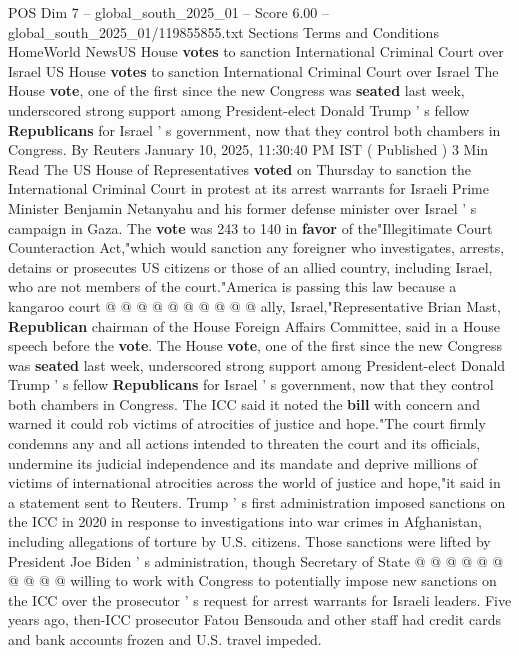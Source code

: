 \begin{textsample}{POS Dim 7 – global\_south\_2025\_01 – Score 6.00 – global\_south\_2025\_01/119855855.txt}  \label{ex:f7_pos_341}
Sections Terms and Conditions HomeWorld NewsUS House \textbf{votes} to sanction International Criminal Court over Israel US House \textbf{votes} to sanction International Criminal Court over Israel The House \textbf{vote}, one of the first since the new Congress was \textbf{seated} last week, underscored strong support among President-elect Donald Trump ' s fellow \textbf{Republicans} for Israel ' s government, now that they control both chambers in Congress.
By Reuters January 10, 2025, 11:30:40 PM IST ( Published ) 3 Min Read The US House of Representatives \textbf{voted} on Thursday to sanction the International Criminal Court in protest at its arrest warrants for Israeli Prime Minister Benjamin Netanyahu and his former defense minister over Israel ' s campaign in Gaza.
The \textbf{vote} was 243 to 140 in \textbf{favor} of the"Illegitimate Court Counteraction Act,"which would sanction any foreigner who investigates, arrests, detains or prosecutes US citizens or those of an allied country, including Israel, who are not members of the court."America is passing this law because a kangaroo court @ @ @ @ @ @ @ @ @ @ ally, Israel,"Representative Brian Mast, \textbf{Republican} chairman of the House Foreign Affairs Committee, said in a House speech before the \textbf{vote}.
The House \textbf{vote}, one of the first since the new Congress was \textbf{seated} last week, underscored strong support among President-elect Donald Trump ' s fellow \textbf{Republicans} for Israel ' s government, now that they control both chambers in Congress.
The ICC said it noted the \textbf{bill} with concern and warned it could rob victims of atrocities of justice and hope."The court firmly condemns any and all actions intended to threaten the court and its officials, undermine its judicial independence and its mandate and deprive millions of victims of international atrocities across the world of justice and hope,"it said in a statement sent to Reuters.
Trump ' s first administration imposed sanctions on the ICC in 2020 in response to investigations into war crimes in Afghanistan, including allegations of torture by U.S. citizens.
Those sanctions were lifted by President Joe Biden ' s administration, though Secretary of State @ @ @ @ @ @ @ @ @ @ willing to work with Congress to potentially impose new sanctions on the ICC over the prosecutor ' s request for arrest warrants for Israeli leaders.
Five years ago, then-ICC prosecutor Fatou Bensouda and other staff had credit cards and bank accounts frozen and U.S. travel impeded.

\end{textsample}

